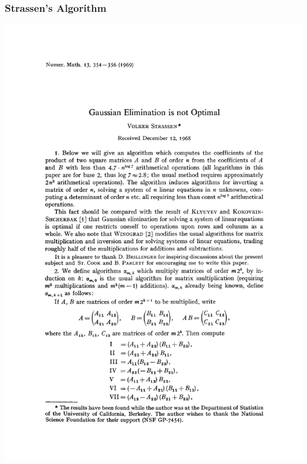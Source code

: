 \begin{frame}
  \frametitle{Strassen's Algorithm}
            \includegraphics[page=1,width=\textwidth,height=0.8\textheight,keepaspectratio]{../papers/Strassen_original_1969.pdf}

\end{frame}
